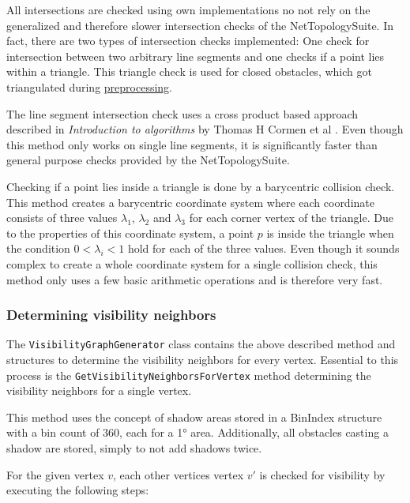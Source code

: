 				All intersections are checked using own implementations no not rely on the generalized and therefore slower intersection checks of the NetTopologySuite.
				In fact, there are two types of intersection checks implemented:
				One check for intersection between two arbitrary line segments and one checks if a point lies within a triangle.
				This triangle check is used for closed obstacles, which got triangulated during \hyperref[subsec:step-1-preprocessing]{preprocessing}.
				
				The line segment intersection check uses a cross product based approach described in \emph{Introduction to algorithms} by Thomas H Cormen et al \cite[1018]{cormen-introduction-to-alg}.
				Even though this method only works on single line segments, it is significantly faster than general purpose checks provided by the NetTopologySuite.
				
				Checking if a point lies inside a triangle is done by a barycentric collision check.
				This method creates a barycentric coordinate system where each coordinate consists of three values $\lambda_1$, $\lambda_2$ and $\lambda_3$ for each corner vertex of the triangle.
				Due to the properties of this coordinate system, a point $p$ is inside the triangle when the condition $0 < \lambda_i < 1$ hold for each of the three values.
				Even though it sounds complex to create a whole coordinate system for a single collision check, this method only uses a few basic arithmetic operations and is therefore very fast.
				
			\subsubsection{Determining visibility neighbors}
			
				The \texttt{VisibilityGraphGenerator} class contains the above described method and structures to determine the visibility neighbors for every vertex.
				Essential to this process is the \texttt{GetVisibilityNeighborsForVertex} method determining the visibility neighbors for a single vertex.
				
				This method uses the concept of shadow areas stored in a BinIndex structure with a bin count of 360, each for a 1° area.
				Additionally, all obstacles casting a shadow are stored, simply to not add shadows twice.
				
				For the given vertex $v$, each other vertices vertex $v'$ is checked for visibility by executing the following steps:
				
